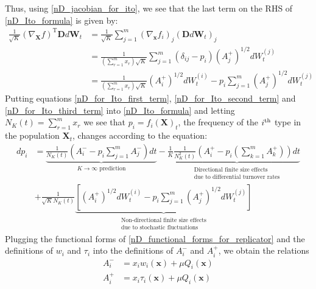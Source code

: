 Thus, using \eqref{nD_jacobian_for_ito}, we see that the last term on the RHS of \eqref{nD_Ito_formula} is given by:
\begin{align}
\frac{1}{\sqrt{K}}\left(\nabla_{\mathbf{X}}f\right)^{\mathrm{T}}\mathbf{D}d\mathbf{W}_t &= \frac{1}{\sqrt{K}}\sum\limits_{j=1}^{m}\left(\nabla_{\mathbf{x}} f_i\right)_j\left(\mathbf{D}d\mathbf{W}_t\right)_j\nonumber\\
&=  \frac{1}{\left(\sum\limits_{r=1}^{m}x_r\right)\sqrt{K}}\sum\limits_{j=1}^{m}\left(\delta_{ij}-p_i\right)\left(A^{+}_{j}\right)^{1/2}dW^{(j)}_t\\
&= \frac{1}{\left(\sum\limits_{r=1}^{m}x_r\right)\sqrt{K}}\left(A^{+}_{i}\right)^{1/2}dW^{(i)}_t - p_i\sum\limits_{j=1}^{m}\left(A^{+}_{j}\right)^{1/2}dW^{(j)}_t\label{nD_for_Ito_third_term}
\end{align}
Putting equations \eqref{nD_for_Ito_first_term}, \eqref{nD_for_Ito_second_term} and \eqref{nD_for_Ito_third_term} into \eqref{nD_Ito_formula} and letting $N_K(t) = \sum\limits_{r=1}^{m}x_r$ we see that $p_i = f_i(\mathbf{X})_t$, the frequency of the $i\textsuperscript{th}$ type in the population $\mathbf{X}_t$, changes according to the equation:
\begin{equation}
\label{nD_general_stoch_freq_change}
\begin{aligned}
dp_i &= \underbrace{\frac{1}{N_K(t)}\left(A^{-}_{i} - p_i\sum\limits_{j=1}^{m}A^{-}_{j}\right)dt}_{\text{$K \to \infty$ prediction}} - \frac{1}{K}\underbrace{\frac{1}{N_K^2(t)}\left(A^{+}_{i}-p_i\left(\sum\limits_{k=1}^{m} A^{+}_k\right)\right)dt}_{\substack{\text{Directional finite size effects}\\\text{due to differential turnover rates}}}\\
&+ \frac{1}{\sqrt{K} N_K(t)}\underbrace{\left[\left(A^{+}_{i}\right)^{1/2}dW^{(i)}_t - p_i\sum\limits_{j=1}^{m}\left(A^{+}_{j}\right)^{1/2}dW^{(j)}_t\right]}_{\substack{\text{Non-directional finite size effects}\\\text{due to stochastic fluctuations}}}
\end{aligned}
\end{equation}
Plugging the functional forms of \eqref{nD_functional_forms_for_replicator} and the definitions of $w_i$ and $\tau_i$ into the definitions of $A^{-}_i$ and $A^{+}_i$, we obtain the relations
\begin{equation}
\label{nD_det_limit_fitness_and_turnover}
\begin{aligned}
A^{-}_i &= x_iw_i(\mathbf{x}) + \mu Q_i(\mathbf{x})\\
A^{+}_i &= x_i\tau_i(\mathbf{x}) + \mu Q_i(\mathbf{x})
\end{aligned}
\end{equation}
